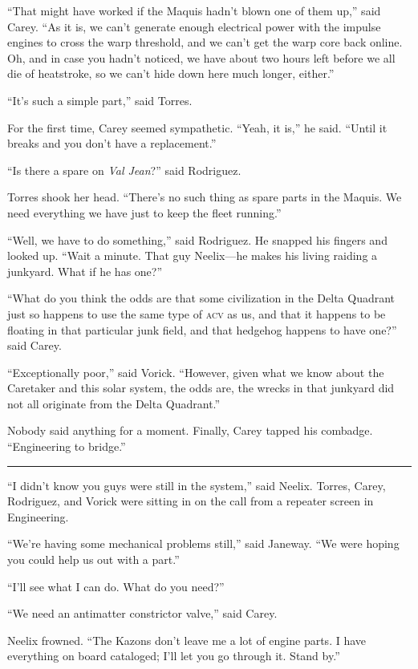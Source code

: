 \documentclass[twoside,letterpaper,12pt]{memoir}
\begin{document}
``That might have worked if the Maquis hadn't blown one of them up,'' said Carey. ``As it is, we can't generate enough electrical power with the impulse engines to cross the warp threshold, and we can't get the warp core back online. Oh, and in case you hadn't noticed, we have about two hours left before we all die of heatstroke, so we can't hide down here much longer, either.''

``It's such a simple part,'' said Torres.

For the first time, Carey seemed sympathetic. ``Yeah, it is,'' he said. ``Until it breaks and you don't have a replacement.''

``Is there a spare on \textit{Val Jean}?'' said Rodriguez.

Torres shook her head. ``There’s no such thing as spare parts in the Maquis. We need everything we have just to keep the fleet running.''

``Well, we have to do something,'' said Rodriguez. He snapped his fingers and looked up. ``Wait a minute. That guy Neelix---he makes his living raiding a junkyard. What if he has one?''

``What do you think the odds are that some civilization in the Delta Quadrant just so happens to use the same type of \textsc{acv} as us, and that it happens to be floating in that particular junk field, and that hedgehog happens to have one?'' said Carey.

``Exceptionally poor,'' said Vorick. ``However, given what we know about the Caretaker and this solar system, the odds are, the wrecks in that junkyard did not all originate from the Delta Quadrant.''

Nobody said anything for a moment. Finally, Carey tapped his combadge. ``Engineering to bridge.''

\fancybreak{\rule{3cm}{0.4 pt}}
``I didn't know you guys were still in the system,'' said Neelix. Torres, Carey, Rodriguez, and Vorick were sitting in on the call from a repeater screen in Engineering.

``We're having some mechanical problems still,'' said Janeway. ``We were hoping you could help us out with a part.''

``I'll see what I can do. What do you need?''

``We need an antimatter constrictor valve,'' said Carey.

Neelix frowned. ``The Kazons don't leave me a lot of engine parts. I have everything on board cataloged; I'll let you go through it. Stand by.''
\end{document}
